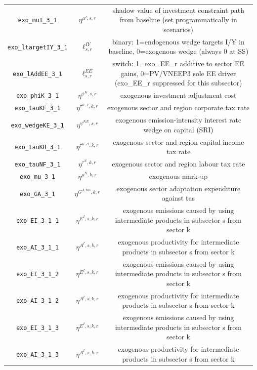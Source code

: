 \begin{center}
\begin{longtable}{ccc}
\texttt{exo\_muI\_3\_1} & ${\eta^{\mu^{I},s,r}}$ & shadow value of investment constraint path from baseline (set programmatically in scenarios)\\
\texttt{exo\_ltargetIY\_3\_1} & ${\ell^{IY}_{s,r}}$ & binary: 1=endogenous wedge targets I/Y in baseline, 0=exogenous wedge (always 0 at SS)\\
\texttt{exo\_lAddEE\_3\_1} & ${\ell^{EE}_{s,r}}$ & switch: 1=exo\_EE\_r additive to sector EE gains, 0=PV/VNEEP3 sole EE driver (exo\_EE\_r suppressed for this subsector)\\
\texttt{exo\_phiK\_3\_1} & ${\eta^{\phi^{K},{s,r}}}$ & exogenous investment adjustment cost\\
\texttt{exo\_tauKF\_3\_1} & ${\eta^{\tau^{K,F},k,r}}$ & exogenous sector and region corporate tax rate\\
\texttt{exo\_wedgeKE\_3\_1} & ${\eta^{\psi^{KE},s,r}}$ & exogenous emission-intensity interest rate wedge on capital (SRI)\\
\texttt{exo\_tauKH\_3\_1} & ${\eta^{\tau^{K,H},k,r}}$ & exogenous sector and region capital income tax rate\\
\texttt{exo\_tauNF\_3\_1} & ${\eta^{\tau^{N},k,r}}$ & exogenous sector and region labour tax rate\\
\texttt{exo\_mu\_3\_1} & ${\eta^{\mu^{N},k,r}}$ & exogenous mark-up\\
\texttt{exo\_GA\_3\_1} & ${\eta^{G^{A,tas},k,r}}$ & exogenous sector adaptation expenditure against tas\\
\texttt{exo\_EI\_3\_1\_1} & ${\eta^{E^{I},s,k,r}}$ & exogenous emissions caused by using intermediate products in subsector s from sector k\\
\texttt{exo\_AI\_3\_1\_1} & ${\eta^{A^{I},s,k,r}}$ & exogenous productivity for intermediate products in subsector s from sector k\\
\texttt{exo\_EI\_3\_1\_2} & ${\eta^{E^{I},s,k,r}}$ & exogenous emissions caused by using intermediate products in subsector s from sector k\\
\texttt{exo\_AI\_3\_1\_2} & ${\eta^{A^{I},s,k,r}}$ & exogenous productivity for intermediate products in subsector s from sector k\\
\texttt{exo\_EI\_3\_1\_3} & ${\eta^{E^{I},s,k,r}}$ & exogenous emissions caused by using intermediate products in subsector s from sector k\\
\texttt{exo\_AI\_3\_1\_3} & ${\eta^{A^{I},s,k,r}}$ & exogenous productivity for intermediate products in subsector s from sector k\\

\end{longtable}
\end{center}
